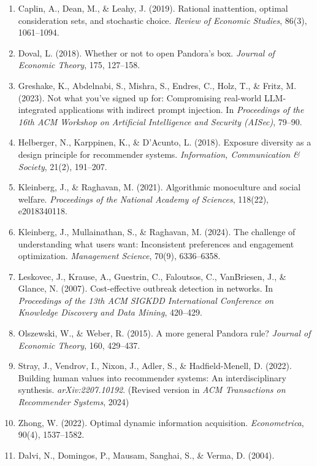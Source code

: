 \documentclass[
  11pt]{article}
\begin{document}
\begin{enumerate}
  a monotone submodular function subject to a matroid constraint.
  \emph{SIAM Journal on Computing}, 40(6), 1740--1766.
\item
  Caplin, A., Dean, M., \& Leahy, J. (2019). Rational inattention,
  optimal consideration sets, and stochastic choice. \emph{Review of
  Economic Studies}, 86(3), 1061--1094.
\item
  Doval, L. (2018). Whether or not to open Pandora's box. \emph{Journal
  of Economic Theory}, 175, 127--158.
\item
  Greshake, K., Abdelnabi, S., Mishra, S., Endres, C., Holz, T., \&
  Fritz, M. (2023). Not what you've signed up for: Compromising
  real-world LLM-integrated applications with indirect prompt injection.
  In \emph{Proceedings of the 16th ACM Workshop on Artificial
  Intelligence and Security (AISec)}, 79--90.
\item
  Helberger, N., Karppinen, K., \& D'Acunto, L. (2018). Exposure
  diversity as a design principle for recommender systems.
  \emph{Information, Communication \& Society}, 21(2), 191--207.
\item
  Kleinberg, J., \& Raghavan, M. (2021). Algorithmic monoculture and
  social welfare. \emph{Proceedings of the National Academy of
  Sciences}, 118(22), e2018340118.
\item
  Kleinberg, J., Mullainathan, S., \& Raghavan, M. (2024). The challenge
  of understanding what users want: Inconsistent preferences and
  engagement optimization. \emph{Management Science}, 70(9), 6336--6358.
\item
  Leskovec, J., Krause, A., Guestrin, C., Faloutsos, C., VanBriesen, J.,
  \& Glance, N. (2007). Cost-effective outbreak detection in networks.
  In \emph{Proceedings of the 13th ACM SIGKDD International Conference
  on Knowledge Discovery and Data Mining}, 420--429.
\item
  Olszewski, W., \& Weber, R. (2015). A more general Pandora rule?
  \emph{Journal of Economic Theory}, 160, 429--437.
\item
  Stray, J., Vendrov, I., Nixon, J., Adler, S., \& Hadfield-Menell, D.
  (2022). Building human values into recommender systems: An
  interdisciplinary synthesis. \emph{arXiv:2207.10192}. (Revised version
  in \emph{ACM Transactions on Recommender Systems}, 2024)
\item
  Zhong, W. (2022). Optimal dynamic information acquisition.
  \emph{Econometrica}, 90(4), 1537--1582.
\item
  Dalvi, N., Domingos, P., Mausam, Sanghai, S., \& Verma, D. (2004).

\end{enumerate}
\end{document}

